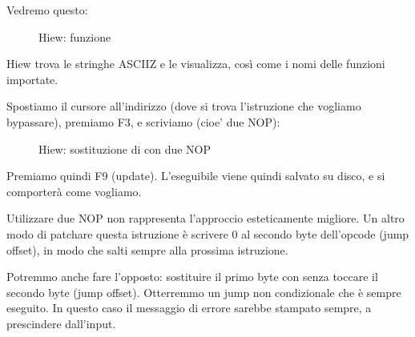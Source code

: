 Vedremo questo:

\begin{figure}[H]
\centering
{}
\caption{Hiew: funzione \main}
\label{fig:scanf_ex3_hiew_1}
\end{figure}

Hiew trova le stringhe \ac{ASCIIZ} e le visualizza, così come i nomi delle funzioni importate.

\clearpage
Spostiamo il cursore all'indirizzo  (dove si trova l'istruzione  che vogliamo bypassare), premiamo F3, e scriviamo  (cioe' due \ac{NOP}):

\begin{figure}[H]
\centering
{}
\caption{Hiew: sostituzione di  con due \ac{NOP}}
\label{fig:scanf_ex3_hiew_2}
\end{figure}

Premiamo quindi F9 (update). L'eseguibile viene quindi salvato su disco, e si comporterà come vogliamo.

Utilizzare due \ac{NOP} non rappresenta l'approccio esteticamente migliore.
Un altro modo di patchare questa istruzione è scrivere 0 al secondo byte dell'opcode (\gls{jump offset}), 
in modo che  salti sempre alla prossima istruzione.

Potremmo anche fare l'opposto: sostituire il primo byte con  senza toccare il secondo byte (\gls{jump offset}).
Otterremmo un jump non condizionale che è sempre eseguito.
In questo caso il messaggio di errore sarebbe stampato sempre, a prescindere dall'input.

